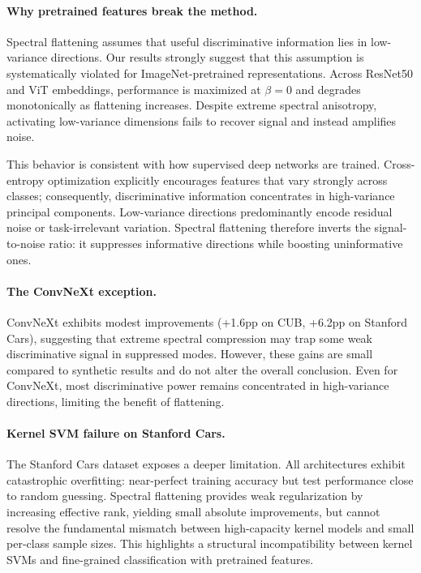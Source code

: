 \documentclass{article}
\begin{document}
\paragraph{Why pretrained features break the method.}
Spectral flattening assumes that useful discriminative information lies in low-variance directions. Our results strongly suggest that this assumption is systematically violated for ImageNet-pretrained representations. Across ResNet50 and ViT embeddings, performance is maximized at $\beta=0$ and degrades monotonically as flattening increases. Despite extreme spectral anisotropy, activating low-variance dimensions fails to recover signal and instead amplifies noise.

This behavior is consistent with how supervised deep networks are trained. Cross-entropy optimization explicitly encourages features that vary strongly across classes; consequently, discriminative information concentrates in high-variance principal components. Low-variance directions predominantly encode residual noise or task-irrelevant variation. Spectral flattening therefore inverts the signal-to-noise ratio: it suppresses informative directions while boosting uninformative ones.

\paragraph{The ConvNeXt exception.}
ConvNeXt exhibits modest improvements (+1.6pp on CUB, +6.2pp on Stanford Cars), suggesting that extreme spectral compression may trap some weak discriminative signal in suppressed modes. However, these gains are small compared to synthetic results and do not alter the overall conclusion. Even for ConvNeXt, most discriminative power remains concentrated in high-variance directions, limiting the benefit of flattening.

\paragraph{Kernel SVM failure on Stanford Cars.}
The Stanford Cars dataset exposes a deeper limitation. All architectures exhibit catastrophic overfitting: near-perfect training accuracy but test performance close to random guessing. Spectral flattening provides weak regularization by increasing effective rank, yielding small absolute improvements, but cannot resolve the fundamental mismatch between high-capacity kernel models and small per-class sample sizes. This highlights a structural incompatibility between kernel SVMs and fine-grained classification with pretrained features.
\end{document}
